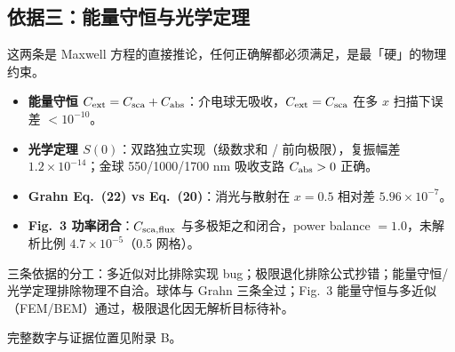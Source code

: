 \subsection{依据三：能量守恒与光学定理}

这两条是 Maxwell 方程的直接推论，任何正确解都必须满足，是最「硬」的物理约束。

\begin{itemize}
  \item \textbf{能量守恒 $C_{\rm ext}=C_{\rm sca}+C_{\rm abs}$}：介电球无吸收，$C_{\rm ext}=C_{\rm sca}$ 在多 $x$ 扫描下误差 $<10^{-10}$。
  \item \textbf{光学定理 $S(0)$}：双路独立实现（级数求和 / 前向极限），复振幅差 $1.2\times10^{-14}$；金球 550/1000/1700 nm 吸收支路 $C_{\rm abs}>0$ 正确。
  \item \textbf{Grahn Eq.~(22) vs Eq.~(20)}：消光与散射在 $x=0.5$ 相对差 $5.96\times10^{-7}$。
  \item \textbf{Fig.~3 功率闭合}：$C_{\rm sca,flux}$ 与多极矩之和闭合，power balance $=1.0$，未解析比例 $4.7\times10^{-5}$（0.5 网格）。
\end{itemize}

\begin{important}
  三条依据的分工：多近似对比排除实现 bug；极限退化排除公式抄错；能量守恒/光学定理排除物理不自洽。球体与 Grahn 三条全过；Fig.~3 能量守恒与多近似（FEM/BEM）通过，极限退化因无解析目标待补。
\end{important}

完整数字与证据位置见附录 B。
